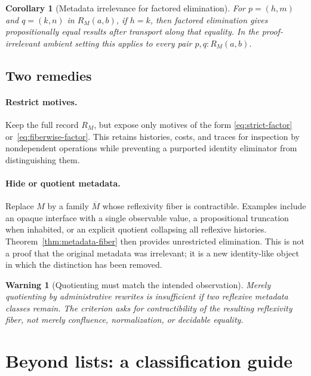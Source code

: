 \documentclass[10pt,reqno]{amsart}
\newtheorem{corollary}[theorem]{Corollary}
\newtheorem{warning}[theorem]{Warning}
\begin{document}
\begin{corollary}[Metadata irrelevance for factored elimination]
\label{cor:factored-irrelevance}
For \(p=(h,m)\) and \(q=(k,n)\) in \(R_M(a,b)\), if \(h=k\), then factored
elimination gives propositionally equal results after transport along that
equality.  In the proof-irrelevant ambient setting this applies to every
pair \(p,q:R_M(a,b)\).
\end{corollary}

\subsection{Two remedies}

\paragraph{Restrict motives.}
Keep the full record \(R_M\), but expose only motives of the form
\eqref{eq:strict-factor} or~\eqref{eq:fiberwise-factor}.  This retains
histories, costs, and traces for inspection by nondependent operations while
preventing a purported identity eliminator from distinguishing them.

\paragraph{Hide or quotient metadata.}
Replace \(M\) by a family \(\overline M\) whose reflexivity fiber is
contractible.  Examples include an opaque interface with a single observable
value, a propositional truncation when inhabited, or an explicit quotient
collapsing all reflexive histories.  Theorem~\ref{thm:metadata-fiber} then
provides unrestricted elimination.  This is not a proof that the original
metadata was irrelevant; it is a new identity-like object in which the
distinction has been removed.

\begin{warning}[Quotienting must match the intended observation]
Merely quotienting by administrative rewrites is insufficient if two
reflexive metadata classes remain.  The criterion asks for contractibility of
the resulting reflexivity fiber, not merely confluence, normalization, or
decidable equality.
\end{warning}

\section{Beyond lists: a classification guide}
\label{sec:examples}
\end{document}
